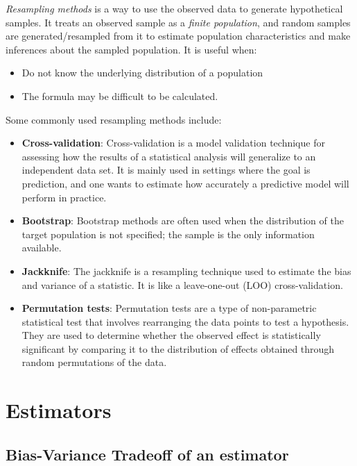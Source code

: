 \documentclass[
  letterpaper,
  DIV=11,
  numbers=noendperiod]{scrreprt}
\begin{document}
\emph{Resampling methods} is a way to use the observed data to generate
hypothetical samples. It treats an observed sample as a \emph{finite
population}, and random samples are generated/resampled from it to
estimate population characteristics and make inferences about the
sampled population. It is useful when:

\begin{itemize}
\item
  Do not know the underlying distribution of a population
\item
  The formula may be difficult to be calculated.
\end{itemize}

Some commonly used resampling methods include:

\begin{itemize}
\item
  \textbf{Cross-validation}: Cross-validation is a model validation
  technique for assessing how the results of a statistical analysis will
  generalize to an independent data set. It is mainly used in settings
  where the goal is prediction, and one wants to estimate how accurately
  a predictive model will perform in practice.
\item
  \textbf{Bootstrap}: Bootstrap methods are often used when the
  distribution of the target population is not specified; the sample is
  the only information available.
\item
  \textbf{Jackknife}: The jackknife is a resampling technique used to
  estimate the bias and variance of a statistic. It is like a
  leave-one-out (LOO) cross-validation.
\item
  \textbf{Permutation tests}: Permutation tests are a type of
  non-parametric statistical test that involves rearranging the data
  points to test a hypothesis. They are used to determine whether the
  observed effect is statistically significant by comparing it to the
  distribution of effects obtained through random permutations of the
  data.
\end{itemize}

\section{Estimators}\label{estimators}

\subsection{Bias-Variance Tradeoff of an
estimator}\label{bias-variance-tradeoff-of-an-estimator}
\end{document}
